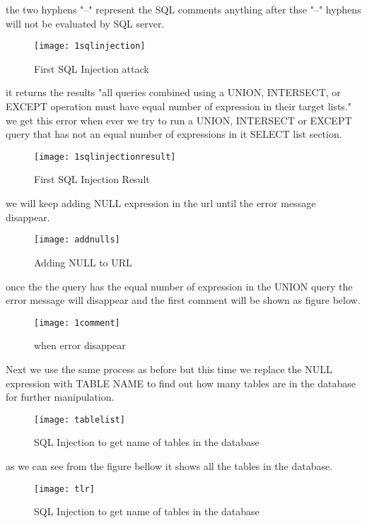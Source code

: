 the two hyphens "--" represent the SQL comments anything after thse "--" hyphens will not be evaluated by SQL server. 

\begin{figure}[h!]
\texttt{[image: 1sqlinjection]}
\caption{First SQL Injection attack}
\end{figure}

it returns the results "all queries combined using a UNION, INTERSECT, or EXCEPT operation must have equal number of expression in their target lists." we get this error when ever we try to run a UNION, INTERSECT or EXCEPT query that has not an equal number of expressions in it SELECT list section. 

\cite{sqllisting2}

\begin{figure}[h!]
\texttt{[image: 1sqlinjectionresult]}
\caption{First SQL Injection Result}
\end{figure}

we will keep adding NULL expression in the url until the error message disappear.

\begin{figure}[h!]
\texttt{[image: addnulls]}
\caption{Adding NULL to URL}
\end{figure}

once the the query has the equal number of expression in the UNION query the error message will disappear and the first comment will be shown as figure below.

\begin{figure}[h!]
\texttt{[image: 1comment]}
\caption{when error disappear}
\end{figure}

Next we use the same process as before but this time we replace the NULL expression with TABLE NAME to find out how many tables are in the database for further manipulation.

\begin{figure}[h!]
\texttt{[image: tablelist]}
\caption{SQL Injection to get name of tables in the database}
\end{figure}
as we can see from the figure bellow it shows all the tables in the database.
\begin{figure}[h!]
\texttt{[image: tlr]}
\caption{SQL Injection to get name of tables in the database}
\end{figure}

